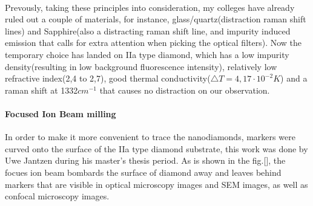 \paragraph{}Prevously, taking these principles into consideration, my colleges have already ruled out a couple of materials, for instance, glass/quartz(distraction raman shift lines) and Sapphire(also a distracting raman shift line, and impurity induced emission that calls for extra attention when picking the optical filters). Now the temporary choice has landed on IIa type diamond, which has a low impurity density(resulting in low background fluorescence intensity), relatively low refractive index(2,4 to 2,7), good thermal conductivity($\bigtriangleup T = 4,17 \cdot 10^{-2}K$) and a raman shift at 1332$cm^{-1} $ that causes no distraction on our observation.

\paragraph{Focused Ion Beam milling}
In order to make it more convenient to trace the nanodiamonds, markers were curved onto the surface of the IIa type diamond substrate, this work was done by Uwe Jantzen during his master's thesis period. As is shown in the fig.[], the focues ion beam bombards the surface of diamond away and leaves behind markers that are visible in optical microscopy images and SEM images, as well as confocal microscopy images.


